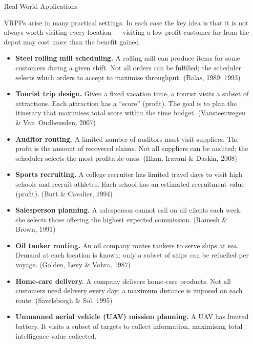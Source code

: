 \documentclass[aspectratio=169,10pt]{beamer}
\begin{document}
\begin{frame}[allowframebreaks]{Real-World Applications}

  VRPPs arise in many practical settings.
  In each case the key idea is that it is not always worth visiting every
  location --- visiting a low-profit customer far from the depot may cost
  more than the benefit gained.

  \medskip
  \begin{itemize}
    \item \textbf{Steel rolling mill scheduling.} A rolling mill
          can produce items for some customers during a given shift.
          Not all orders can be fulfilled; the scheduler selects which
          orders to accept to maximise throughput.
          (Balas, 1989; 1993)

    \item \textbf{Tourist trip design.} Given a fixed vacation time,
          a tourist visits a subset of attractions.
          Each attraction has a ``score'' (profit).
          The goal is to plan the itinerary that maximises total score
          within the time budget.
          (Vansteenwegen \& Van~Oudheusden, 2007)

    \item \textbf{Auditor routing.} A limited number of auditors must visit
          suppliers.
          The profit is the amount of recovered claims.
          Not all suppliers can be audited; the scheduler selects the most
          profitable ones.
          (Ilhan, Iravani \& Daskin, 2008)

    \item \textbf{Sports recruiting.} A college recruiter has limited travel
          days to visit high schools and recruit athletes.
          Each school has an estimated recruitment value (profit).
          (Butt \& Cavalier, 1994)

    \item \textbf{Salesperson planning.} A salesperson cannot call on all
          clients each week; she selects those offering the highest expected
          commission.
          (Ramesh \& Brown, 1991)

    \item \textbf{Oil tanker routing.} An oil company routes tankers to
          serve ships at sea.
          Demand at each location is known; only a subset of ships can be
          refuelled per voyage.
          (Golden, Levy \& Vohra, 1987)

    \item \textbf{Home-care delivery.} A company delivers home-care products.
          Not all customers need delivery every day; a maximum distance is
          imposed on each route.
          (Savelsbergh \& Sol, 1995)

    \item \textbf{Unmanned aerial vehicle (UAV) mission planning.}
          A UAV has limited battery.
          It visits a subset of targets to collect information, maximising
          total intelligence value collected.
  \end{itemize}

\end{frame}
\end{document}
